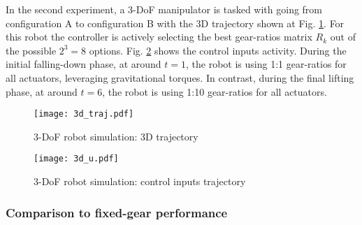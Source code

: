 In the second experiment, a 3-DoF manipulator is tasked with going from configuration A to configuration B with the 3D trajectory shown at Fig. \ref{fig:3d_traj}. For this robot the controller is actively selecting the best gear-ratios matrix $R_k$ out of the possible $2^3=8$ options. Fig. \ref{fig:3d_u} shows the control inputs activity. During the initial falling-down phase, at around $t=1$, the robot is using 1:1 gear-ratios for all actuators, leveraging gravitational torques. In contrast, during the final lifting phase, at around $t=6$, the robot is using 1:10 gear-ratios for all actuators. 
%
%
%
\begin{figure}[htp]
	\centering
		\texttt{[image: 3d\_traj.pdf]}
	\caption{ 3-DoF robot simulation: 3D trajectory }
	\label{fig:3d_traj}
\end{figure}
%
%
\begin{figure}[htp]
	\centering
		\texttt{[image: 3d\_u.pdf]}
	\caption{ 3-DoF robot simulation: control inputs trajectory}
	\label{fig:3d_u}
\end{figure}
%



\subsubsection{Comparison to fixed-gear performance}


